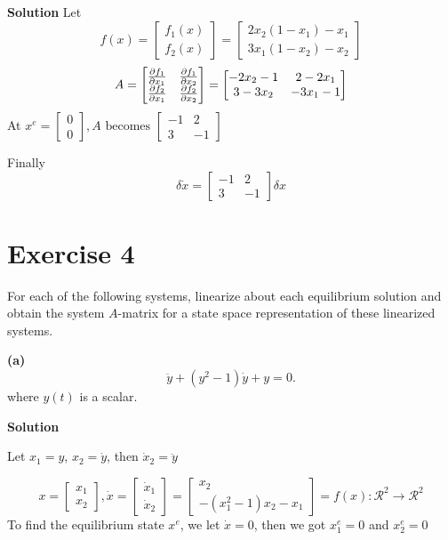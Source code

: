 \documentclass[12pt,a4paper]{article}
\begin{document}
\textbf{Solution}
Let 
\[
f(x) = \begin{bmatrix}
	f_1(x) \\ f_2(x)
\end{bmatrix} = \begin{bmatrix}
	2 x_2 (1 - x_1) - x_1 \\
3 x_1 (1 - x_2) - x_2 
\end{bmatrix}
\]
\[
A = \begin{bmatrix}
	{\partial f_1 \over\partial x_1 } & {\partial f_1 \over\partial x_2 } \\
	{\partial f_2 \over\partial x_1 } & {\partial f_2 \over\partial x_2 }
\end{bmatrix} = \begin{bmatrix}
-2x_2 - 1 & 2 - 2x_1 \\
3-3x_2 	&	-3x_1 - 1
\end{bmatrix}
\]
At $x^e = \begin{bmatrix}
	0 \\ 0
\end{bmatrix}, A \text{ becomes } \begin{bmatrix}
-1 & 2 \\ 3 & -1
\end{bmatrix}$


Finally
\[
	\delta \dot x = \begin{bmatrix}
		-1 & 2 \\ 3 & -1
	\end{bmatrix} \delta x
\]


\section*{Exercise 4}
For each of the following systems, linearize about each equilibrium solution and obtain the system $A$-matrix for a state space representation of these linearized systems.

\textbf{(a)}
\[\ddot y+(y^2-1)\dot y+y=0.\]
where $y(t)$ is a scalar.

\textbf{Solution}

Let $x_1 = y$, $x_2 = \dot y$, then $ \dot x_2 = \ddot y $

\[x = 
\begin{bmatrix}
	x_1 \\ x_2 
\end{bmatrix}
, \dot x = \begin{bmatrix}
	\dot x_1 \\ \dot x_2 
\end{bmatrix} = \begin{bmatrix}
	x_2 \\ -(x_1^2 - 1)x_2 - x_1
\end{bmatrix} = f(x):\mathcal R^2 \to \mathcal R^2
\]
To find the equilibrium state $x^e$, we let $\dot x = 0$, then we got $x_1^e = 0$ and $x_2^e = 0$
\end{document}
